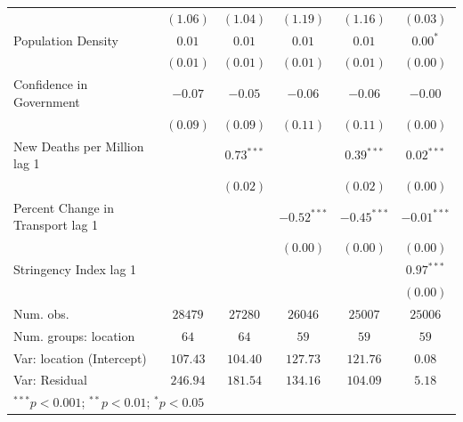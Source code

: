 \documentclass[
  12pt,
]{article}
\begin{document}
\begin{table}
\begin{center}
\begin{small}
\begin{tabular}{l c c c c c}
                                  & $(1.06)$     & $(1.04)$     & $(1.19)$      & $(1.16)$      & $(0.03)$      \\
Population Density                & $0.01$       & $0.01$       & $0.01$        & $0.01$        & $0.00^{*}$    \\
                                  & $(0.01)$     & $(0.01)$     & $(0.01)$      & $(0.01)$      & $(0.00)$      \\
Confidence in Government          & $-0.07$      & $-0.05$      & $-0.06$       & $-0.06$       & $-0.00$       \\
                                  & $(0.09)$     & $(0.09)$     & $(0.11)$      & $(0.11)$      & $(0.00)$      \\
New Deaths per Million lag 1      &              & $0.73^{***}$ &               & $0.39^{***}$  & $0.02^{***}$  \\
                                  &              & $(0.02)$     &               & $(0.02)$      & $(0.00)$      \\
Percent Change in Transport lag 1 &              &              & $-0.52^{***}$ & $-0.45^{***}$ & $-0.01^{***}$ \\
                                  &              &              & $(0.00)$      & $(0.00)$      & $(0.00)$      \\
Stringency Index lag 1            &              &              &               &               & $0.97^{***}$  \\
                                  &              &              &               &               & $(0.00)$      \\
\hline
Num. obs.                         & $28479$      & $27280$      & $26046$       & $25007$       & $25006$       \\
Num. groups: location             & $64$         & $64$         & $59$          & $59$          & $59$          \\
Var: location (Intercept)         & $107.43$     & $104.40$     & $127.73$      & $121.76$      & $0.08$        \\
Var: Residual                     & $246.94$     & $181.54$     & $134.16$      & $104.09$      & $5.18$        \\
\hline
\multicolumn{6}{l}{\tiny{$^{***}p<0.001$; $^{**}p<0.01$; $^{*}p<0.05$}}
\end{tabular}
\end{small}
\label{tab:addit}
\end{center}
\end{table}
\end{document}
